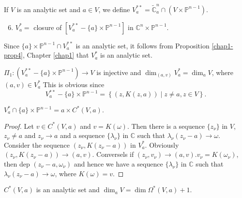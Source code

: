 \setcounter{definition}{4}
\begin{definition}\label{chap3-defin5} %
If $V$ is an analytic set and $a \in V$, we define $ V^{\ast \ast}_{a}
= \widetilde{\mathbb{C}}^{n}_{a}\cap (V\times \mathbb{P}^{n-1})$. 
\begin{enumerate}[(1)]
\setcounter{enumi}{5}
\item $V^{\ast}_{a}=$ closure of
  $[V^{\ast\ast}_{a}-\{a\}\times\mathbb{P}^{n-1}]$ in
  $\mathbb{C}^{n}\times \mathbb{P}^{n-1}$. 
\end{enumerate}
\end{definition}

\begin{remark}\label{chap3-rem3} %
 Since $\{a\} \times \mathbb{P}^{n-1}\cap V^{\ast\ast}_{a}$ is an
  analytic set, it follows from Proposition \ref{chap1-prop4}, Chapter
  \ref{chap1} that $ V^{\ast}_{a}$ is an analytic set.  
\end{remark} 

\begin{remark}\label{chap3-rem4} %
 $\Pi_{1}: (V^{\ast\ast}_{a} - \{a\} \times \mathbb{P}^{n-1})
  \to V$ is injective and $\dim_{(a,v)}V^{\ast}_{a} =
  \dim_{a} V$,  where  $(a,v) \in V^{\ast}_{a}$ This is obvious
  since 
$$ 
  V^{\ast \ast}_{a}- \{a\} \times \mathbb{P}^{n-1} =
  \left\{(z, K(z,a)) \mid z \neq a, z \in V \right\}.
  $$ 
\end{remark}

\setcounter{proposition}{0}
\begin{proposition}\label{chap3-prop1} %
 $V^{\ast}_{a}\cap \{a\} \times \mathbb{P}^{n-1} = a \times C^{\ast}(V,a)$.
\end{proposition}

\begin{proof}
  Let $ v \in C^{\ast}(V,a)$ and $ v= K(\omega)$. Then there is a
  sequence $\{z_{\nu}\}$ in $V$, $z_{\nu} \neq a$  and  $z_{\nu}
  \to a$ and a sequence $\{\lambda_{\nu}\}$ in $\mathbb{C}$ 
such that $\lambda_{\nu}(z_{\nu} - a) \to
  \omega$. Consider the sequence $(z_{\nu},K(z_{\nu}-a))$
   in  $V^{\ast}_{a}$. 
 Obviously\pageoriginale $(z_{\nu}, K(z_{\nu} -a)) \to (a,v)$.
 Conversels if 
 $ (z_{\nu}, v_{\nu}) \to (a,v). v_{\nu} = K(\omega_{\nu})$,
 then dep $(z_{\nu} -a, \omega_{\nu})$ and hence we have a sequence
 $\{\lambda_{\nu}\}$ in $ \mathbb{C}$ such that 
$\lambda_{\nu}(z_{\nu} -a) \to \omega$, where $K(\omega) =v$. 
\end{proof}

\begin{proposition}\label{chap3-prop2} %
$C^{\ast} (V, a)$ is an analytic set and $\dim_{a} V = \dim
  \Omega^{\ast}(V, a)+1$. 
\end{proposition}

